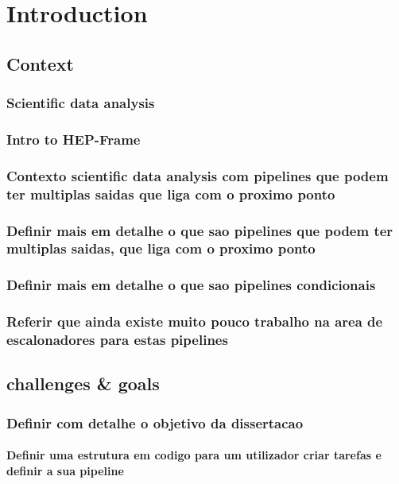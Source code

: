 \chapter{Introduction}


\section{ Context}


\subsection{Scientific data analysis}
\subsection{Intro to HEP-Frame}
\subsection{Contexto scientific data analysis com pipelines que podem ter multiplas saidas que liga com o proximo ponto}
\subsection{Definir mais em detalhe o que sao pipelines que podem ter multiplas saidas, que liga com o proximo ponto}
\subsection{Definir mais em detalhe o que sao pipelines condicionais}
\subsection{Referir que ainda existe muito pouco trabalho na area de escalonadores para estas pipelines}




\section{challenges \& goals}


\subsection{ Definir com detalhe o objetivo da dissertacao}
\subsubsection{Definir uma estrutura em codigo para um utilizador criar tarefas e definir a sua pipeline}
